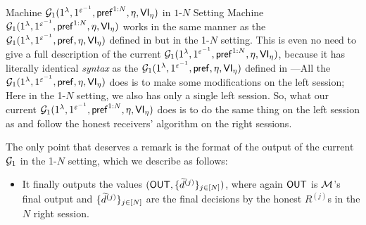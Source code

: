 



\begin{AlgorithmBox}[label={pq:machine:g1:1-many}]{Machine \textnormal{$\mathcal{G}_1(1^\lambda, 1^{\varepsilon^{-1}}, \mathsf{pref}^{1:N}, \eta, \mathsf{VI}_\eta)$} in $1$-$N$ Setting}
Machine $\mathcal{G}_1(1^\lambda, 1^{\varepsilon^{-1}}, \mathsf{pref}^{1:N}, \eta, \mathsf{VI}_\eta)$ works in the same manner as the $\mathcal{G}_1(1^\lambda, 1^{\varepsilon^{-1}}, \mathsf{pref}, \eta, \mathsf{VI}_\eta)$ defined in  but in the 1-$N$ setting. This is even no need to give a full description of the current $\mathcal{G}_1(1^\lambda, 1^{\varepsilon^{-1}}, \mathsf{pref}^{1:N}, \eta, \mathsf{VI}_\eta)$, because it has literally identical {\em syntax} as the $\mathcal{G}_1(1^\lambda, 1^{\varepsilon^{-1}}, \mathsf{pref}, \eta, \mathsf{VI}_\eta)$ defined in ---All the $\mathcal{G}_1(1^\lambda, 1^{\varepsilon^{-1}}, \mathsf{pref}, \eta, \mathsf{VI}_\eta)$ does is to make some modifications on the left session; Here in the 1-$N$ setting, we also has only a single left session. So, what our current $\mathcal{G}_1(1^\lambda, 1^{\varepsilon^{-1}}, \mathsf{pref}^{1:N}, \eta, \mathsf{VI}_\eta)$ does is to do the same thing on the left session as  and follow the honest receivers' algorithm on the right sessions.

The only point that deserves a remark is the format of the output of the current $\mathcal{G}_1$ in the 1-$N$ setting, which we describe as follows:
\begin{itemize}

    \item It finally outputs the values $(\mathsf{OUT}, \{\widetilde{d}^{(j)}\}_{j \in [N]})$, where again $\mathsf{OUT}$ is $\mathcal{M}$'s final output and $\{\widetilde{d}^{(j)}\}_{j \in [N]}$ are the  final decisions by the honest $R^{(j)}$s in the $N$ right session.
\end{itemize}
\end{AlgorithmBox}

